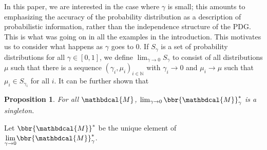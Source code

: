 \documentclass{article}
\theoremstyle{plain}
\newtheorem{prop}[theorem]{Proposition}
\theoremstyle{definition}
\theoremstyle{remark}
\let\H\relax
\DeclareMathOperator{\H}{\mathrm{H}} %
\DeclareMathOperator*{\E}{\mathbb{E}} %
\newcommand\mat[1]{\mathbf{#1}}
\newcommand{\commentout}[1]{\ignorespaces}
\newcommand{\bp}[1][L]{\mat{p}_{\!_{#1}\!}}
\newcommand{\dg}[1]{\mathbdcal{#1}}
\newcommand\Inc{\mathit{Inc}}
\newcommand{\ed}[3]{#2
  \overset{\smash{\mskip-5mu\raisebox{-1pt}{$\scriptscriptstyle
        #1$}}}{\rightarrow} #3}
\newcommand{\alle}[1][L]{_{ \ed {#1}XY}}
\numberwithin{equation}{section}
\begin{document}
In this paper, we are interested in the case where $\gamma$ is small;
this amounts to emphasizing the accuracy of the probability
distribution as a description of probabilistic information, rather than
the independence structure of the PDG.  This is what was going on in
all the examples in the introduction.  This motivates us to consider
what happens as $\gamma$ goes to 0.  If $S_\gamma$ is a set of
probability distributions for all $\gamma \in [0,1]$, we define
$\lim_{\gamma \rightarrow 0} 
S_\gamma$ to consist of all distributions $\mu$ such that 
there is a sequence $(\gamma_i, \mu_i)_{i \in \mathbb N}$ with
$\gamma_i \to 0$ and $\mu_i \to \mu$ such that $\mu_i \in
S_{\gamma_i}$ for all $i$. 
It can be further shown that 
\begin{prop}\label{prop:limit-uniq}
    For all $\dg M$,
	$\lim_{\gamma\to0}\bbr{\dg M}_\gamma^*$ is a singleton.
\end{prop}
Let
$\bbr{{\dg M}}^*$ be the unique element of $\smash{\lim\limits_{\gamma
    \rightarrow 0}} \bbr{{\dg M}}_\gamma^*$. 
\commentout{
There is a unique such distribution because, as we now
show, the score is strongly convex
which can be found efficiently \cite{strongconvexopt}.
}
\commentout{
    \begin{prop}\label{prop:u-convex}
      $\bbr{\dg M}_\gamma(\mu)$ is $\gamma$-strongly convex.%
    \end{prop}
    \commentout{
    \begin{proof}
      $\Inc_{\dg M}( \mu)$ is convex in $\mu$
      (\Cref{thm:inc-convex}), and $\gamma\sum\alle \E_{x\sim \mu_X}
      \H(\bp(x))$ is linear in $\mu$.  
		Negative entropy is $1$-strongly convex
		(\Cref{prop:neg-ent-convex}), so $- \gamma \H(\mu)$ is $\gamma$-strongly convex.
		The sum of a $\gamma$-strongly convex, linear, and
        convex functions must be $\gamma$-strongly convex. 
	\end{proof}
    }
}%
\end{document}
